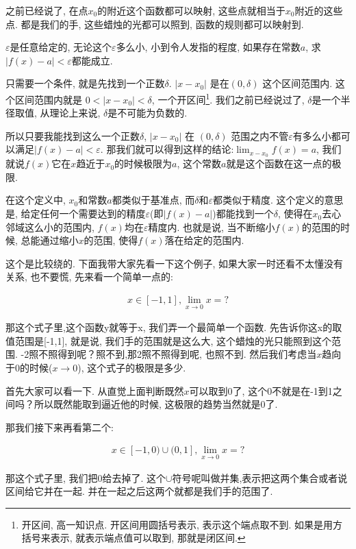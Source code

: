 之前已经说了, 在点$x_0$的附近这个函数都可以映射, 这些点就相当于$x_0$附近的这些点. 都是我们的手, 这些蜡烛的光都可以照到, 函数的规则都可以映射到. 

$\varepsilon$是任意给定的, 无论这个$\varepsilon$多么小, 小到令人发指的程度, 如果存在常数$a$, 求$|f(x)-a| < \varepsilon$都能成立. 

只需要一个条件, 就是先找到一个正数$\delta$. $|x-x_0|$ 是在$(0,\delta)$ 这个区间范围内. 这个区间范围内就是 $0<|x-x_0|<\delta$, 一个开区间\footnote{开区间, 高一知识点. 开区间用圆括号表示, 表示这个端点取不到. 如果是用方括号来表示, 就表示端点值可以取到, 那就是闭区间.}. 我们之前已经说过了, $\delta$是一个半径取值, 从理论上来说, $\delta$是不可能为负数的. 

所以只要我能找到这么一个正数$\delta$, $|x-x_0|$ 在 $(0, \delta)$ 范围之内不管$\varepsilon$有多么小都可以满足$|f(x) - a| < \varepsilon$. 那我们就可以得到这样的结论:$\lim_{x-x_0}f(x) = a$, 我们就说$f(x)$它在$x$趋近于$x_0$的时候极限为$a$, 这个常数$a$就是这个函数在这一点的极限.

在这个定义中, $x_0$和常数$a$都类似于基准点, 而$\delta$和$\varepsilon$都类似于精度. 这个定义的意思是, 给定任何一个需要达到的精度$\varepsilon$(即$|f(x)-a|$)都能找到一个$\delta$, 使得在$x_0$去心邻域这么小的范围内, $f(x)$均在$\varepsilon$精度内. 也就是说, 当不断缩小$f(x)$的范围的时候, 总能通过缩小$x$的范围, 使得$f(x)$落在给定的范围内. 

这个是比较绕的. 下面我带大家先看一下这个例子, 如果大家一时还看不太懂没有关系, 也不要慌, 先来看一个简单一点的: 

\begin{align*}
  x\in [-1, 1], \lim_{x \to 0} x = ?
\end{align*}

那这个式子里,这个函数y就等于x, 我们弄一个最简单一个函数. 先告诉你这x的取值范围是[-1,1], 就是说, 我们手的范围就是这么大, 这个蜡烛的光只能照到这个范围. -2照不照得到呢？照不到,那2照不照得到呢, 也照不到. 然后我们考虑当$x$趋向于0的时候($x\to0$), 这个式子的极限是多少.

首先大家可以看一下. 从直觉上面判断既然$x$可以取到0了, 这个0不就是在-1到1之间吗？所以既然能取到逼近他的时候, 这极限的趋势当然就是0了. 

那我们接下来再看第二个: 

\begin{align*}
  x \in [-1,0) \cup (0, 1], \lim_{x \to 0} x = ?
\end{align*}

那这个式子里, 我们把0给去掉了. 这个$\cup$符号呢叫做并集,表示把这两个集合或者说区间给它并在一起. 并在一起之后这两个就都是我们手的范围了. 

